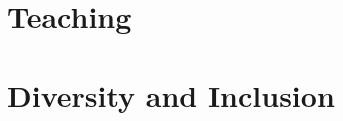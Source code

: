 \documentclass[12pt, letterpaper, sans]{moderncv}
\begin{document}
% 





\section{Teaching}

\section{Diversity and Inclusion}
\end{document}

